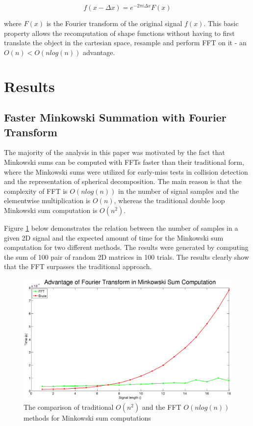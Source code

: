 \documentclass[letterpaper, 10 pt, conference]{ieeeconf}
\begin{document}
\begin{equation}
 f(x - \Delta x) = e^{-2\pi i \Delta x} F(x)
\end{equation}

\noindent where $F(x)$ is the Fourier transform of the original signal $f(x)$. This basic property allows
the recomputation of shape functions without having to first translate the object in the cartesian
space, resample and perform FFT on it - an $O(n) < O(nlog(n))$ advantage.

\section{Results}
\subsection{Faster Minkowski Summation with Fourier Transform}

The majority of the analysis in this paper was motivated by the fact that Minkowski sums can be
computed with FFTs faster than their traditional form, where the Minkowski sums were utilized
for early-miss tests in collision detection and the representation of spherical decomposition. 
The main reason is that the complexity of FFT is $O(nlog(n))$ in the number of signal samples 
and the elementwise multiplication is $O(n)$, whereas the traditional double loop Minkowski
sum computation is $O(n^2)$. 

Figure \ref{fig:fft} below demonstrates the relation between the number of samples in a
given 2D signal and the expected amount of time for the Minkowski sum computation for two different
methods. The results were generated by computing the sum of 100 pair of random 2D matrices in
100 trials. The results clearly show that the FFT surpasses the traditional approach.

\begin{figure}[ht!] 
  \centering
  \includegraphics[width=1.0\linewidth]{Figures/fft.png}
  \caption{The comparison of traditional $O(n^2)$ and the FFT $O(nlog(n))$ methods for Minkowski sum
  computations}
  \label{fig:fft}
\end{figure}
\end{document}

